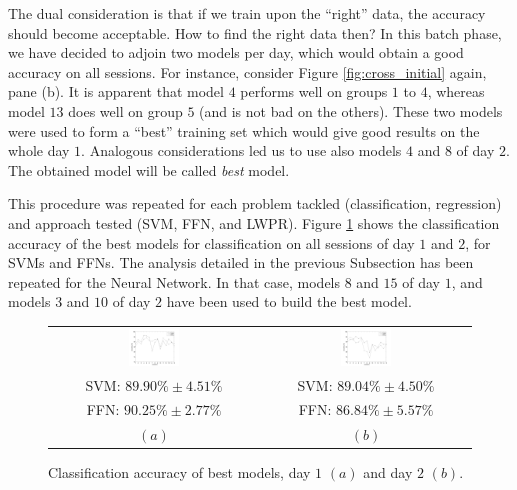 
The dual consideration is that if we train upon the ``right'' data,
the accuracy should become acceptable. How to find the right data
then? In this batch phase, we have decided to adjoin two models per
day, which would obtain a good accuracy on all sessions. For instance,
consider Figure \ref{fig:cross_initial} again, pane (b). It is
apparent that model $4$ performs well on groups $1$ to $4$, whereas
model $13$ does well on group $5$ (and is not bad on the
others). These two models were used to form a ``best'' training set
which would give good results on the whole day $1$. Analogous
considerations led us to use also models $4$ and $8$ of day $2$. The
obtained model will be called \emph{best} model.

This procedure was repeated for each problem tackled (classification,
regression) and approach tested (SVM, FFN, and LWPR). Figure
\ref{fig:best_class} shows the classification accuracy of the best
models for classification on all sessions of day $1$ and $2$, for SVMs
and FFNs. The analysis detailed in the previous Subsection has been
repeated for the Neural Network. In that case, models $8$ and $15$ of
day $1$, and models $3$ and $10$ of day $2$ have been used to build
the best model.

\begin{figure}[!ht] \centering
  \begin{tabular}{cc}
    \includegraphics[width=0.25\textwidth]{figs/fig_class_resCrossBestOnDay1.png} &
    \includegraphics[width=0.25\textwidth]{figs/fig_class_resCrossBestOnDay2.png} \\
    SVM: $89.90\% \pm 4.51\%$ & SVM: $89.04\% \pm 4.50\%$ \\
    FFN: $90.25\% \pm 2.77\%$ & FFN: $86.84\% \pm 5.57\%$ \\
    $(a)$ & $(b)$ \\
  \end{tabular}
  \caption{Classification accuracy of best models, day $1$ $(a)$ and
    day $2$ $(b)$.}
  \label{fig:best_class}
\end{figure}

